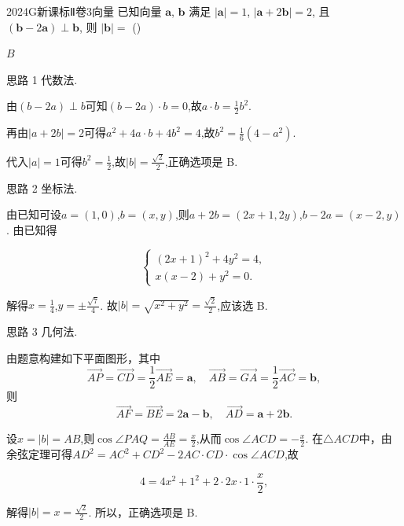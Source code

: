 \documentclass[12pt,UTF-8,a4paper]{ctexart}
\numberwithin{figure}{section}
\theoremstyle{mystyle}
\theoremstyle{mystylekaishu}
\theoremstyle{mystyle}
\numberwithin{xiti}{section}
\begin{document}

\begin{problem}{2024}{G}{新课标Ⅱ卷}{3}{向量}
已知向量 $\boldsymbol{a}$, $\boldsymbol{b}$ 满足 $|\boldsymbol{a}|=1$, $|\boldsymbol{a}+2\boldsymbol{b}|=2$, 且 $(\boldsymbol{b}-2\boldsymbol{a}) \perp \boldsymbol{b}$, 则 $|\boldsymbol{b}|=$ (\hspace{1cm})
\begin{choices}
\end{choices}
\end{problem}

\begin{answer}
$B$
\end{answer}

\begin{solutions}
思路 1 代数法.

由$(b-2a) \perp b$可知$(b-2a) \cdot b=0$,故$a \cdot b=\frac{1}{2}b^2$.

再由$|a+2b|=2$可得$a^2+4a \cdot b+4b^2=4$,故$b^2=\frac{1}{6}(4-a^2)$.

代入$|a|=1$可得$b^2=\frac{1}{2}$,故$|b|=\frac{\sqrt{2}}{2}$,正确选项是 B.

思路 2 坐标法.

由已知可设$a=(1,0)$,$b=(x,y)$,则$a+2b=(2x+1,2y)$,$b-2a=(x-2,y)$. 由已知得

$$
\begin{cases} (2x+1)^2+4y^2=4, \\ x(x-2)+y^2=0. \end{cases}
$$

解得$x=\frac{1}{4}$,$y=\pm\frac{\sqrt{7}}{4}$. 故$|b|=\sqrt{x^2+y^2}=\frac{\sqrt{2}}{2}$,应该选 B.

思路 3 几何法.

由题意构建如下平面图形，其中
\[
\overrightarrow{AP}=\overrightarrow{CD}=\frac{1}{2}\overrightarrow{AE}=\boldsymbol{a},\quad
\overrightarrow{AB}=\overrightarrow{GA}=\frac{1}{2}\overrightarrow{AC}=\boldsymbol{b},
\]
则
\[
\overrightarrow{AF}=\overrightarrow{BE}=2\boldsymbol{a}-\boldsymbol{b},\quad
\overrightarrow{AD}=\boldsymbol{a}+2\boldsymbol{b}.
\]

设$x=|b|=AB$,则$\cos \angle PAQ=\frac{AB}{AE}=\frac{x}{2}$,从而$\cos \angle ACD=-\frac{x}{2}$. 在$\triangle ACD$中，由余弦定理可得$AD^2=AC^2+CD^2-2AC \cdot CD \cdot \cos \angle ACD$,故

$$
4=4x^2+1^2+2 \cdot 2x \cdot 1 \cdot \frac{x}{2},
$$

解得$|b|=x=\frac{\sqrt{2}}{2}$. 所以，正确选项是 B.
\end{solutions}
\end{document}
